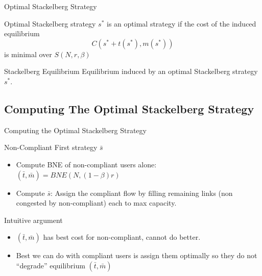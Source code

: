 \documentclass[english, smaller]{beamer}
\theoremstyle{plain}
\theoremstyle{definition}
\theoremstyle{plain}
\theoremstyle{plain}
\begin{document}
\begin{frame}{Optimal Stackelberg Strategy}

\begin{block}{Optimal Stackelberg strategy}
$s^*$ is an optimal strategy if the cost of the induced equilibrium
\[
C(s^* + t(s^*), m(s^*))
\]
is minimal over $S(N, r, \beta)$
\end{block}



\begin{block}{Stackelberg Equilibrium}
Equilibrium induced by an optimal Stackelberg strategy $s^*$.
\end{block}

\end{frame}


\subsection{Computing The Optimal Stackelberg Strategy}

\begin{frame}{Computing the Optimal Stackelberg Strategy}

\begin{block}{Non-Compliant First strategy $\bar{s}$}
\begin{itemize}
\item Compute BNE of non-compliant users alone: $(\bar{t}, \bar{m}) = BNE(N, (1-\beta)r)$
\item Compute $\bar{s}$: Assign the compliant flow by filling remaining links (non congested by non-compliant) each to max capacity.
\end{itemize}
\end{block}

\pause 
Intuitive argument
\begin{itemize}
\item $(\bar{t}, \bar{m})$ has best cost for non-compliant, cannot do better.
\item Best we can do with compliant users is assign them optimally so they do not ``degrade'' equilibrium $(\bar{t}, \bar{m})$
\end{itemize}


\end{frame}
\end{document}

